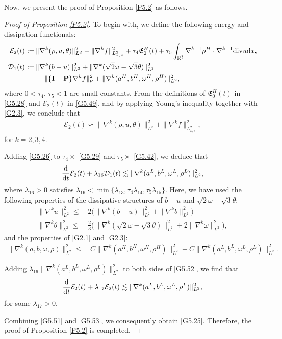 \documentclass[reqno,11pt]{amsart}
\theoremstyle{plain}
\numberwithin{equation}{section}
\begin{document}
Now, we present the  proof of Proposition \ref{P5.2} as follows.  
\begin{proof}[Proof of Proposition \ref{P5.2}]
To begin with, we define the following energy and dissipation functionals:   
\begin{align}\label{G5.49}
\mathcal{E}_2(t):=\,&  \|\nabla^k(\rho,u,\theta)\|_{L^2}^{2} 
+\|\nabla^k f\|_{L_{x,v}^2}^2  +\tau_4\mathfrak{E}_0^H(t)
+\tau_5\int_{\mathbb{R}^3}\nabla^{k-1}\rho^H\cdot\nabla^{k-1}{\rm div}u{\rm d}x,\\ \label{G5.50}
\mathcal{D}_{1}(t):=\,&\|\nabla^k(b-u)\|_{L^2}^{2}
+\|\nabla^k(\sqrt{2}\omega-\sqrt{3}\theta)\|_{L^2}^2\nonumber\\
&+\|\{\mathbf{I}-\mathbf{P}\}\nabla^k f\|_{\nu}^{2}+\|\nabla^k(a^H,b^H,\omega^H,\rho^H)\|_{L^2}^2,
\end{align}
where $0<\tau_4$, $\tau_5<1$ are small constants.
From the definitions of $\mathfrak{E}_0^H(t)$ in \eqref{G5.28} and $\mathcal{E}_2(t)$ in \eqref{G5.49}, and by applying Young's inequality together with \eqref{G2.3}, we conclude that    
\begin{align}\label{G5.51}
 \mathcal{E}_2(t)\backsim   \|\nabla^k(\rho,u,\theta)\|_{L^2}^{2} +\|\nabla^k f\|_{L_{x,v}^2}^2,
\end{align}
for $k=2,3,4$.

Adding \eqref{G5.26} to $\tau_4\times$ \eqref{G5.29} and $\tau_5\times$ \eqref{G5.42}, we deduce that
\begin{align}\label{G5.52}
\frac{{\rm d}}{{\rm d}t}\mathcal{E}_2(t)+\lambda_{16} \mathcal{D}_{1}(t)\lesssim \|\nabla^k(a^L,b^L,\omega^L,\rho^L)\|_{L^2}^2,   
\end{align}
where $\lambda_{16} > 0$ satisfies $\lambda_{16} < \min\{\lambda_{13}, \tau_4\lambda_{14}, \tau_5\lambda_{15}\}$.
Here, we have used the following properties of the dissipative structures of $b-u$ and $\sqrt{2}\omega-\sqrt{3}\theta$:
\begin{align*}
\|\nabla^k u\|_{L^2}^2 \leq&\, 2\big(\|\nabla^k(b-u)\|_{L^2}^2+\|\nabla^k b\|_{L^2}^2\big)\\
\|\nabla^k \theta\|_{L^2}^2 \leq&\, \frac{2}{3}\big(\|\nabla^k(\sqrt{2}\omega-\sqrt{3}\theta)\|_{L^2}^2 + 2\|\nabla^k \omega\|_{L^2}^2\big), 
\end{align*}
and the properties of \eqref{G2.1} and \eqref{G2.3}:
\begin{align*}
\|\nabla^k (a,b,\omega,\rho)\|_{L^2}^2\leq&\, C\|\nabla^k (a^H,b^H,\omega^H,\rho^H)\|_{L^2}^2+C\|\nabla^k (a^L,b^L,\omega^L,\rho^L)\|_{L^2}^2.    
\end{align*}

Adding $\lambda_{16}  \|\nabla^k (a^L,b^L,\omega^L,\rho^L)\|_{L^2}^2$ to both  sides
of \eqref{G5.52}, we find that 
\begin{align}\label{G5.53}
 \frac{{\rm d}}{{\rm d}t}\mathcal{E}_2(t)+\lambda_{17} \mathcal{E}_2(t)\lesssim \|\nabla^k(a^L,b^L,\omega^L,\rho^L)\|_{L^2}^2,   
\end{align}
for some $\lambda_{17}>0$. 

Combining \eqref{G5.51} and \eqref{G5.53}, we consequently obtain \eqref{G5.25}. Therefore, the proof of Proposition \ref{P5.2} is completed.
\end{proof}
\end{document}
